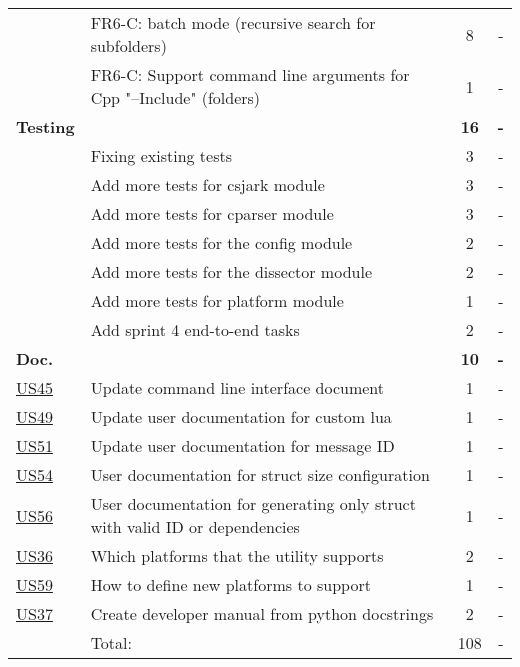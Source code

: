 \begin{table}[!htb]
\begin{tabularx}{\textwidth}{l X c c}
	 & FR6-C: \Gls{batch mode} (recursive search for subfolders) &  8  & - \\
	 & FR6-C: Support command line arguments for Cpp "--Include" (folders) & 1 & - \\
	\addlinespace
	\textbf{Testing} &  & \textbf{16} & \textbf{-} \\
	 & Fixing existing tests & 3 & - \\
	 & Add more tests for csjark module & 3 & - \\
	 & Add more tests for cparser module & 3 & - \\
	 & Add more tests for the config module & 2 & - \\
	 & Add more tests for the dissector module & 2 & - \\
	 & Add more tests for platform module & 1 & - \\
	 & Add sprint 4 end-to-end tasks & 2 & - \\
	\addlinespace
	\textbf{Doc.} &  & \textbf{10} & \textbf{-} \\
	\hyperref[tab:req:stories10]{US45} & Update command line interface document & 1 & - \\
	\hyperref[tab:req:stories11]{US49} & Update user documentation for custom \Gls{lua} & 1 & - \\
	\hyperref[tab:req:stories12]{US51} & Update user documentation for message ID & 1 & - \\
	\hyperref[tab:req:stories12]{US54} & User documentation for \gls{struct} size configuration & 1 & - \\
	\hyperref[tab:req:stories12]{US56} & User documentation for generating only \gls{struct} with valid ID or dependencies & 1 & - \\
	\hyperref[tab:req:stories9]{US36} & Which platforms that the \gls{utility} supports & 2 & - \\
	\hyperref[tab:req:stories13]{US59} & How to define new platforms to support & 1 & - \\
	\hyperref[tab:req:stories9]{US37} & Create developer manual from python docstrings & 2 & - \\
	\midrule
	& Total: & 108 &  -\\
	\bottomrule
\end{tabularx}
\end{table}

